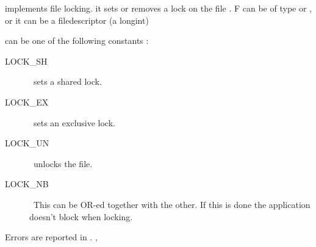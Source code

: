 { implements file locking. it sets or removes a lock on the file
. F can be of type  or , or it can be a \linux
filedescriptor (a longint)

 can be one of the following constants :
\begin{description}
\item [LOCK\_SH] \ sets a shared lock.
\item [LOCK\_EX] \ sets an exclusive lock.
\item [LOCK\_UN] \ unlocks the file.
\item [LOCK\_NB] \ This can be OR-ed together with the other. If this is done
the application doesn't block when locking.
\end{description}
}
{Errors are reported in .}
{, }